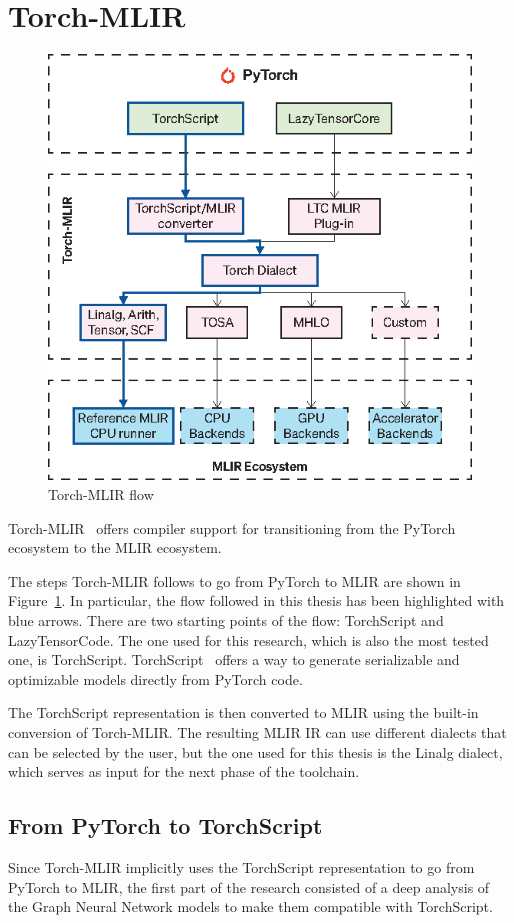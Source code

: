 \section{Torch-MLIR}
\label{sec:toolchain-torch_mlir}%

\begin{figure}[t]
    \centering
    \includegraphics[height=0.6\textwidth]{Images/torch-mlir}
    \caption{Torch-MLIR flow}
    \label{fig:torch-mlir}
\end{figure}

Torch-MLIR~\cite{torch_mlir} offers compiler support for transitioning from the PyTorch ecosystem to the MLIR ecosystem.

The steps Torch-MLIR follows to go from PyTorch to MLIR are shown in Figure~\ref{fig:torch-mlir}.
In particular, the flow followed in this thesis has been highlighted with blue arrows.
There are two starting points of the flow: TorchScript and LazyTensorCode.
The one used for this research, which is also the most tested one, is TorchScript.
TorchScript~\cite{torchscript} offers a way to generate serializable and optimizable models directly from PyTorch code.

The TorchScript representation is then converted to MLIR using the built-in conversion of Torch-MLIR. The resulting MLIR IR can use different dialects that can be selected by the user, but the one used for this thesis is the Linalg dialect, which serves as input for the next phase of the toolchain.

\subsection{From PyTorch to TorchScript}
\label{subsec:pytorch-to-torchscript}%

Since Torch-MLIR implicitly uses the TorchScript representation to go from PyTorch to MLIR, the first part of the research consisted of a deep analysis of the Graph Neural Network models to make them compatible with TorchScript.

